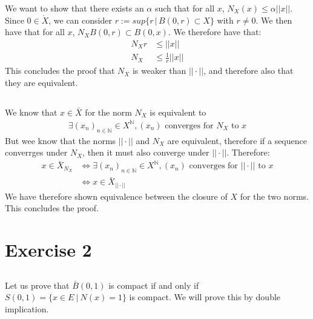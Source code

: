 \documentclass{article}
\begin{document}
\subsubsection{} %

We want to show that there exists an $\alpha$ such that for all $x$, $N_X(x) \leq \alpha ||x||$.
Since $0 \in \mathring{X}$, we can consider $r := sup\{r \, | \, B(0,r) \subset X \}$ with $r \neq 0$. We then have that for all $x$, $N_XB(0,r) \subset B(0,x)$. We therefore have that:
\begin{align*}
	N_Xr &\leq ||x||\\
	N_X &\leq \frac{1}{r}||x||
\end{align*}
This concludes the proof that $N_X$ is weaker than $|| \cdot ||$, and therefore also that they are equivalent.

\subsection{} %

We know that $x \in \bar{X}$ for the norm $N_X$ is equivalent to
\begin{align*}
	\exists (x_n)_{n \in \mathbb{N}} \in X^{\mathbb{N}}, (x_n) \text{ converges for }N_X \text{ to } x
\end{align*}
But wee know that the norms $||\cdot ||$ and $N_X$ are equivalent, therefore if a sequence converrges under $N_X$, then it must also converge under $|| \cdot ||$. Therefore:
\begin{align*}
	 x \in \bar{X}_{N_X} &\Leftrightarrow \exists (x_n)_{n \in \mathbb{N}} \in X^{\mathbb{N}},(x_n) \text{ converges for }|| \cdot || \text{ to } x\\
	&\Leftrightarrow x \in \bar{X}_{|| \cdot ||}
\end{align*}
We have therefore shown equivalence between the closure of $X$ for the two norms. This concludes the proof.
	


\section{Exercise 2}

\subsection{} %

Let us prove that $\bar{B}(0,1)$ is compact if and only if $S(0, 1) = \{ x\in E \ | \ N(x)=1 \}$ is compact. We will prove this by double implication. \\
\end{document}
